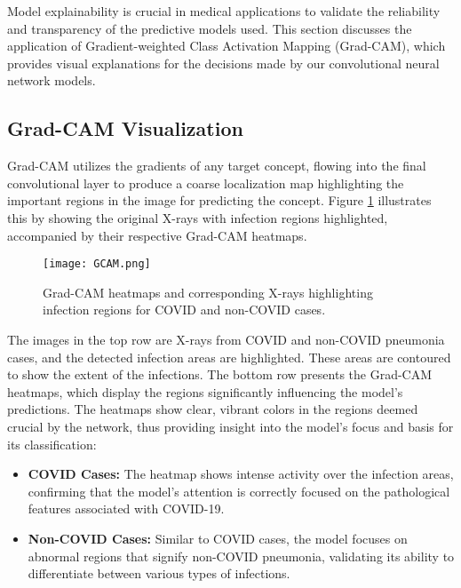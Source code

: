 \documentclass[10pt]{article}
\begin{document}
Model explainability is crucial in medical applications to validate the reliability and transparency of the predictive models used. This section discusses the application of Gradient-weighted Class Activation Mapping (Grad-CAM), which provides visual explanations for the decisions made by our convolutional neural network models.

\subsection{Grad-CAM Visualization}

Grad-CAM utilizes the gradients of any target concept, flowing into the final convolutional layer to produce a coarse localization map highlighting the important regions in the image for predicting the concept. Figure \ref{fig:GradCAM} illustrates this by showing the original X-rays with infection regions highlighted, accompanied by their respective Grad-CAM heatmaps.

\begin{figure}[ht]
    \centering
    \texttt{[image: GCAM.png]}
    \caption{Grad-CAM heatmaps and corresponding X-rays highlighting infection regions for COVID and non-COVID cases.}
    \label{fig:GradCAM}
\end{figure}


The images in the top row are X-rays from COVID and non-COVID pneumonia cases, and the detected infection areas are highlighted. These areas are contoured to show the extent of the infections. The bottom row presents the Grad-CAM heatmaps, which display the regions significantly influencing the model's predictions. The heatmaps show clear, vibrant colors in the regions deemed crucial by the network, thus providing insight into the model's focus and basis for its classification:

\begin{itemize}
    \item \textbf{COVID Cases:} The heatmap shows intense activity over the infection areas, confirming that the model's attention is correctly focused on the pathological features associated with COVID-19.
    \item \textbf{Non-COVID Cases:} Similar to COVID cases, the model focuses on abnormal regions that signify non-COVID pneumonia, validating its ability to differentiate between various types of infections.
\end{itemize}
\end{document}
